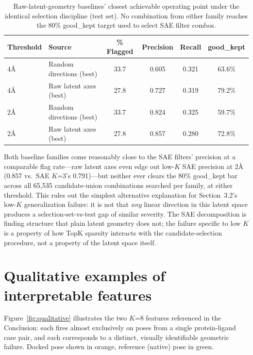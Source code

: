 \documentclass{article}
\begin{document}
\begin{table}[!ht]
\caption{Raw-latent-geometry baselines' closest achievable operating point under the identical selection discipline (test set). No combination from either family reaches the 80\% good\_kept target used to select SAE filter combos.}
\label{tab:baseline}
\centering
\begin{small}
\begin{tabular}{llcccc}
\toprule
Threshold & Source & \% Flagged & Precision & Recall & good\_kept \\
\midrule
4\r{A} & Random directions (best) & 33.7 & 0.605 & 0.321 & 63.6\% \\
4\r{A} & Raw latent axes (best)   & 27.8 & 0.727 & 0.319 & 79.2\% \\
2\r{A} & Random directions (best) & 33.7 & 0.824 & 0.325 & 59.7\% \\
2\r{A} & Raw latent axes (best)   & 27.8 & 0.857 & 0.280 & 72.8\% \\
\bottomrule
\end{tabular}
\end{small}
\end{table}

Both baseline families come reasonably close to the SAE filters' precision at a comparable flag rate---raw latent axes even edge out low-$K$ SAE precision at 2\r{A} (0.857 vs.\ SAE $K$=3's 0.791)---but neither ever clears the 80\% good\_kept bar across all 65{,}535 candidate-union combinations searched per family, at either threshold. This rules out the simplest alternative explanation for Section~3.2's low-$K$ generalization failure: it is not that \emph{any} linear direction in this latent space produces a selection-set-vs-test gap of similar severity. The SAE decomposition is finding structure that plain latent geometry does not; the failure specific to low $K$ is a property of how TopK sparsity interacts with the candidate-selection procedure, not a property of the latent space itself.

\section{Qualitative examples of interpretable features}
\label{app:qualitative}

Figure~\ref{fig:qualitative} illustrates the two $K$=8 features referenced in the Conclusion: each fires almost exclusively on poses from a single protein-ligand case pair, and each corresponds to a distinct, visually identifiable geometric failure. Docked pose shown in orange, reference (native) pose in green.
\end{document}
